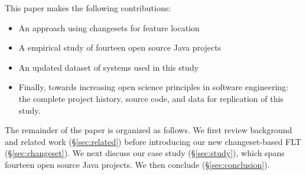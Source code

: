 This paper makes the following contributions:

\begin{itemize}
    \item An approach using changesets for feature location
    \item A empirical study of fourteen open source Java projects
    \item An updated dataset of systems used in this study
    \item Finally, towards increasing open science principles in software engineering:
        the complete project history, source code, and data for replication of this study.
\end{itemize}

The remainder of the paper is organized as follows.
We first review background and related work (\S\ref{sec:related})
before introducing our new changeset-based FLT (\S\ref{sec:changeset}).
We next discuss our case study (\S\ref{sec:study}), which spans fourteen open source Java projects.
We then conclude (\S\ref{sec:conclusion}).

